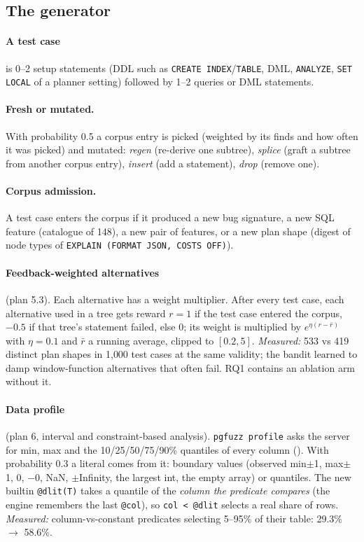\subsection{The generator}

\paragraph{A test case} is 0--2 setup statements (DDL such as
\texttt{CREATE INDEX}/\texttt{TABLE}, DML, \texttt{ANALYZE}, \texttt{SET LOCAL}
of a planner setting) followed by 1--2 queries or DML statements.

\paragraph{Fresh or mutated.} With probability 0.5 a corpus entry is picked
(weighted by its finds and how often it was picked) and mutated:
\emph{regen} (re-derive one subtree), \emph{splice} (graft a subtree from
another corpus entry), \emph{insert} (add a statement), \emph{drop} (remove one).

\paragraph{Corpus admission.} A test case enters the corpus if it produced a
new bug signature, a new SQL feature (catalogue of 148), a new pair of
features, or a new plan shape (digest of node types of
\texttt{EXPLAIN (FORMAT JSON, COSTS OFF)}).

\paragraph{Feedback-weighted alternatives} (plan 5.3). Each alternative has a
weight multiplier. After every test case, each alternative used in a tree gets
reward $r = 1$ if the test case entered the corpus, $-0.5$ if that tree's
statement failed, else 0; its weight is multiplied by $e^{\eta(r - \bar r)}$
with $\eta=0.1$ and $\bar r$ a running average, clipped to $[0.2, 5]$.
\emph{Measured:} 533 vs 419 distinct plan shapes in 1{,}000 test cases at the
same validity; the bandit learned to damp window-function alternatives that
often fail. RQ1 contains an ablation arm without it.

\paragraph{Data profile} (plan 6, interval and constraint-based analysis).
\texttt{pgfuzz profile} asks the server for min, max and the 10/25/50/75/90\%
quantiles of every column (). With probability 0.3 a
literal comes from it: boundary values (observed min$\pm$1, max$\pm$1, 0, $-0$,
NaN, $\pm$Infinity, the largest int, the empty array) or quantiles. The new
builtin \texttt{@dlit(T)} takes a quantile of the \emph{column the predicate
compares} (the engine remembers the last \texttt{@col}), so
\texttt{col < @dlit} selects a real share of rows. \emph{Measured:}
column-vs-constant predicates selecting 5--95\% of their table: 29.3\%
$\rightarrow$ 58.6\%.

